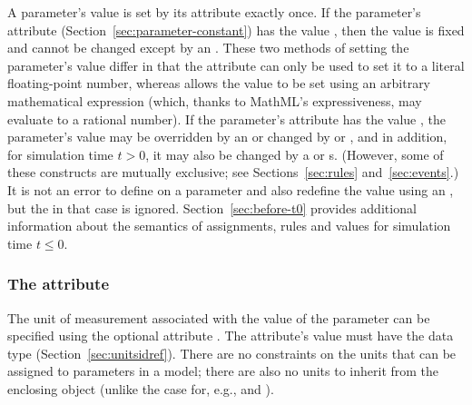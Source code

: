 A parameter's value is set by its  attribute exactly
once.  If the parameter's  attribute
(Section~\ref{sec:parameter-constant}) has the value ,
then the value is fixed and cannot be changed except by an
\InitialAssignment.  These two methods of setting the parameter's
value differ in that the  attribute can only be used
to set it to a literal floating-point number, whereas
\InitialAssignment allows the value to be set using an arbitrary
mathematical expression (which, thanks to MathML's expressiveness,
may evaluate to a rational number).  If the parameter's
 attribute has the value , the
parameter's value may be overridden by an \InitialAssignment or
changed by \AssignmentRule or \AlgebraicRule, and in addition, for
simulation time $t > 0$, it may also be changed by a \RateRule or
\Event{}s.  (However, some of these constructs are mutually
exclusive; see Sections~\ref{sec:rules} and~\ref{sec:events}.)  It
is not an error to define  on a parameter and also
redefine the value using an \InitialAssignment, but the
 in that case is ignored.
Section~\ref{sec:before-t0} provides additional information about
the semantics of assignments, rules and values for simulation time
$t \leq 0$.


\subsubsection{The  attribute}
\label{sec:parameter-units}

The unit of measurement associated with the value of the parameter
can be specified using the optional attribute .  The
attribute's value must have the data type 
(Section~\ref{sec:unitsidref}).  There are no constraints on the
units that can be assigned to parameters in a model; there are
also no units to inherit from the enclosing \Model object (unlike
the case for, e.g., \Species and \Compartment).

